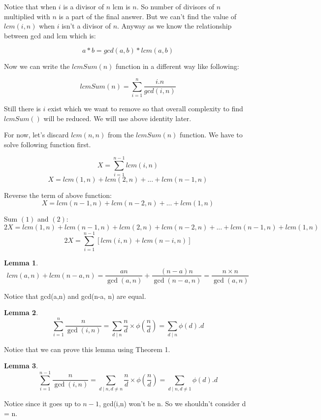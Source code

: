\documentclass[a4paper,12pt]{article}
\newtheorem{lemma}{Lemma}
\begin{document}
Notice that when $i$ is a divisor of $n$ lcm is $n$. So number of divisors of $n$ multiplied with $n$ is a part of the final answer. But we can't find the value of $lcm(i, n)$ when $i$ isn't a divisor of $n$. Anyway as we know the relationship between gcd and lcm which is: 

\bigskip
$$a * b = gcd(a, b) * lcm(a, b)$$ 
\bigskip

Now we can write the $lcmSum(n)$ function in a different way like following:

\bigskip
$$lcmSum(n) = \sum_{i=1}^n \frac{i . n}{gcd(i, n)}$$
\bigskip


Still there is $i$ exist which we want to remove so that overall complexity to find $lcmSum()$ will be reduced. We will use above identity later. 

\bigskip

For now, let's discard $lcm(n, n)$ from the $lcmSum(n)$ function. We have to solve following function first. 

\bigskip
$$X = \sum_{i=1}^{n-1} lcm(i, n)$$
\begin{equation}
X = lcm(1, n) + lcm(2, n) + ... + lcm(n-1, n)
\end{equation}
\bigskip

Reverse the term of above function:
\begin{equation}
X = lcm(n-1, n) + lcm(n-2, n) + ... + lcm(1, n)
\end{equation}
\bigskip

Sum $(1)$ and $(2)$:
$$2X = lcm(1, n) + lcm(n-1, n) + lcm(2, n) + lcm(n-2, n) + ... + lcm(n-1, n) + lcm(1, n)$$
\begin{equation}
2X = \sum_{i=1}^{n-1} [lcm(i, n) + lcm(n-i, n)]
\end{equation}
\bigskip

\begin{lemma}
$$lcm(a, n) + lcm(n-a, n) = \frac{ an } { \gcd(a, n)} + \frac{ (n-a)n} { \gcd(n-a, n)} = \frac{ n\times n} { \gcd(a,n) }$$
\end{lemma}
Notice that gcd(a,n) and gcd(n-a, n) are equal.
\bigskip

\begin{lemma}
$$\sum_{i = 1}^{n} \frac{n}{\gcd(i,n)} = \sum_{d \mid n} \frac{n}{d} \times \phi(\frac{n}{d}) = \sum_{d\mid n} \phi(d) . d$$
\end{lemma}
Notice that we can prove this lemma using Theorem 1.
\bigskip

\begin{lemma}
$$\sum_{i = 1}^{n-1} \frac{n}{\gcd(i,n)} = \sum_{d \mid n, d \neq n} \frac{n}{d} \times \phi(\frac{n}{d}) = \sum_{d\mid n, d \neq 1} \phi(d) . d$$
\end{lemma}
Notice since it goes up to $n-1$, gcd(i,n) won't be n. So we shouldn't consider d = n.
\bigskip
\end{document}
